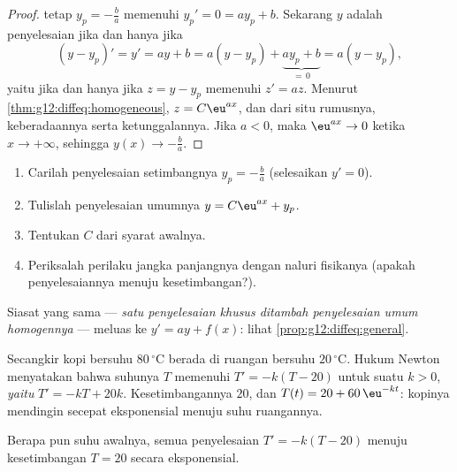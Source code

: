 \begin{proof}
 tetap $y_p = -\frac{b}{a}$ memenuhi $y_p' = 0 = a y_p + b$. Sekarang $y$
adalah penyelesaian jika dan hanya jika
\[
(y - y_p)' = y' = ay + b = a(y - y_p) + \underbrace{a y_p + b}_{=\,0}
= a (y - y_p),
\]
yaitu jika dan hanya jika $z = y - y_p$ memenuhi $z' = az$. Menurut
\cref{thm:g12:diffeq:homogeneous}, $z = C\eu^{ax}$, dan dari situ rumusnya,
keberadaannya serta ketunggalannya. Jika $a < 0$, maka $\eu^{ax} \to 0$ ketika
$x \to +\infty$, sehingga $y(x) \to -\frac ba$.
\end{proof}

\begin{method}[Menyelesaikan $y' = ay + b$ dengan syarat awal]\label{met:g12:diffeq:solve}
\begin{enumerate}
  \item Carilah penyelesaian setimbangnya $y_p = -\frac{b}{a}$ (selesaikan $y' = 0$).
  \item Tulislah penyelesaian umumnya $y = C\eu^{ax} + y_p$.
  \item Tentukan $C$ dari syarat awalnya.
  \item Periksalah perilaku jangka panjangnya dengan naluri fisikanya (apakah
        penyelesaiannya menuju kesetimbangan?).
\end{enumerate}
Siasat yang sama --- \emph{satu penyelesaian khusus ditambah penyelesaian umum
 homogennya} --- meluas ke $y' = ay + f(x)$: lihat
\cref{prop:g12:diffeq:general}.
\end{method}

\begin{example}\label{ex:g12:diffeq:cooling}
Secangkir kopi bersuhu $80\,^\circ$C berada di ruangan bersuhu $20\,^\circ$C. Hukum
Newton menyatakan bahwa suhunya $T$ memenuhi $T' = -k(T - 20)$ untuk suatu $k > 0$,
\emph{yaitu} $T' = -kT + 20k$. Kesetimbangannya $20$, dan
$T(t) = 20 + 60\,\eu^{-kt}$: kopinya mendingin secepat eksponensial menuju suhu
ruangannya.
\end{example}

\begin{omfigure}

{\small Berapa pun suhu awalnya, semua penyelesaian
$T' = -k(T - 20)$ menuju kesetimbangan $T = 20$ secara eksponensial.}
\end{omfigure}

